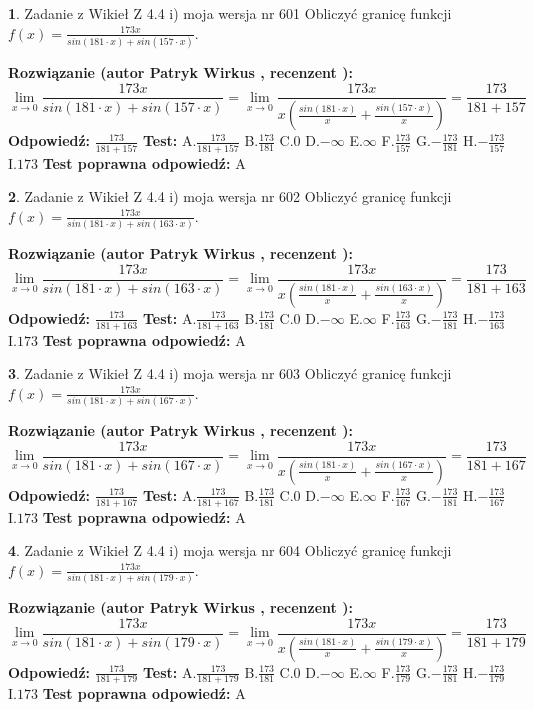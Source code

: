 \documentclass[12pt, a4paper]{article}
\theoremstyle{definition} %
\newtheorem{zad}{}
\newcommand{\zadStart}[1]{\begin{zad}#1\newline}
\newcommand{\zadStop}{\end{zad}}
\newcommand{\rozwStart}[2]{\noindent \textbf{Rozwiązanie (autor #1 , recenzent #2): }\newline}
\newcommand{\rozwStop}{\newline}
\newcommand{\odpStart}{\noindent \textbf{Odpowiedź:}\newline}
\newcommand{\odpStop}{\newline}
\newcommand{\testStart}{\noindent \textbf{Test:}\newline}
\newcommand{\testStop}{\newline}
\newcommand{\kluczStart}{\noindent \textbf{Test poprawna odpowiedź:}\newline}
\newcommand{\kluczStop}{\newline}
\begin{document}
\zadStart{Zadanie z Wikieł Z 4.4 i) moja wersja nr 601}
Obliczyć granicę funkcji $f(x)=\frac{173x}{sin(181\cdot x) +sin(157\cdot x)}$.
\zadStop
\rozwStart{Patryk Wirkus}{}
$$\lim\limits_{x\to 0}\frac{173x}{sin(181\cdot x) +sin(157\cdot x)}=\lim\limits_{x\to 0}\frac{173x}{x(\frac{sin(181\cdot x)}{x}+\frac{sin(157\cdot x)}{x})}=\frac{173}{181+157}$$
\rozwStop
\odpStart
$\frac{173}{181+157}$
\odpStop
\testStart
A.$\frac{173}{181+157}$
B.$\frac{173}{181}$
C.$0$
D.$-\infty$
E.$\infty$
F.$\frac{173}{157}$
G.$-\frac{173}{181}$
H.$-\frac{173}{157}$
I.$173$
\testStop
\kluczStart
A
\kluczStop



\zadStart{Zadanie z Wikieł Z 4.4 i) moja wersja nr 602}
Obliczyć granicę funkcji $f(x)=\frac{173x}{sin(181\cdot x) +sin(163\cdot x)}$.
\zadStop
\rozwStart{Patryk Wirkus}{}
$$\lim\limits_{x\to 0}\frac{173x}{sin(181\cdot x) +sin(163\cdot x)}=\lim\limits_{x\to 0}\frac{173x}{x(\frac{sin(181\cdot x)}{x}+\frac{sin(163\cdot x)}{x})}=\frac{173}{181+163}$$
\rozwStop
\odpStart
$\frac{173}{181+163}$
\odpStop
\testStart
A.$\frac{173}{181+163}$
B.$\frac{173}{181}$
C.$0$
D.$-\infty$
E.$\infty$
F.$\frac{173}{163}$
G.$-\frac{173}{181}$
H.$-\frac{173}{163}$
I.$173$
\testStop
\kluczStart
A
\kluczStop



\zadStart{Zadanie z Wikieł Z 4.4 i) moja wersja nr 603}
Obliczyć granicę funkcji $f(x)=\frac{173x}{sin(181\cdot x) +sin(167\cdot x)}$.
\zadStop
\rozwStart{Patryk Wirkus}{}
$$\lim\limits_{x\to 0}\frac{173x}{sin(181\cdot x) +sin(167\cdot x)}=\lim\limits_{x\to 0}\frac{173x}{x(\frac{sin(181\cdot x)}{x}+\frac{sin(167\cdot x)}{x})}=\frac{173}{181+167}$$
\rozwStop
\odpStart
$\frac{173}{181+167}$
\odpStop
\testStart
A.$\frac{173}{181+167}$
B.$\frac{173}{181}$
C.$0$
D.$-\infty$
E.$\infty$
F.$\frac{173}{167}$
G.$-\frac{173}{181}$
H.$-\frac{173}{167}$
I.$173$
\testStop
\kluczStart
A
\kluczStop



\zadStart{Zadanie z Wikieł Z 4.4 i) moja wersja nr 604}
Obliczyć granicę funkcji $f(x)=\frac{173x}{sin(181\cdot x) +sin(179\cdot x)}$.
\zadStop
\rozwStart{Patryk Wirkus}{}
$$\lim\limits_{x\to 0}\frac{173x}{sin(181\cdot x) +sin(179\cdot x)}=\lim\limits_{x\to 0}\frac{173x}{x(\frac{sin(181\cdot x)}{x}+\frac{sin(179\cdot x)}{x})}=\frac{173}{181+179}$$
\rozwStop
\odpStart
$\frac{173}{181+179}$
\odpStop
\testStart
A.$\frac{173}{181+179}$
B.$\frac{173}{181}$
C.$0$
D.$-\infty$
E.$\infty$
F.$\frac{173}{179}$
G.$-\frac{173}{181}$
H.$-\frac{173}{179}$
I.$173$
\testStop
\kluczStart
A
\kluczStop
\end{document}
